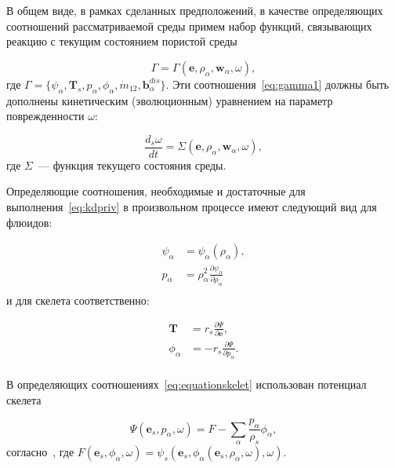 В общем виде, в рамках сделанных предположений, в качестве определяющих соотношений рассматриваемой среды примем набор функций, связывающих реакцию  с текущим состоянием пористой среды

\begin{equation}
  \label{eq:gamma1}
  \Gamma = \Gamma(\textbf{e}, \rho_{\alpha}, \textbf{w}_{\alpha}, \omega),
\end{equation}
где $\Gamma =  \{ \psi_{\alpha}, \textbf{T}_s, p_{\alpha}, \phi_{\alpha}, \dot{m}_{12}, \textbf{b}^{dis}_{\alpha} \}$. Эти соотношения~\eqref{eq:gamma1} должны быть дополнены кинетическим (эволюционным) уравнением на параметр поврежденности $\omega$:

\begin{equation}
  \label{eq:omega1}
  \frac{d_s \omega}{dt} = \Sigma (\textbf{e}, \rho_{\alpha}, \textbf{w}_{\alpha}, \omega),
\end{equation}
где $\Sigma$~--- функция текущего состояния среды.

Определяющие соотношения, необходимые и достаточные для выполнения~\eqref{eq:kdpriv} в произвольном процессе имеют следующий вид для флюидов:

\begin{equation}
  \label{eq:equationfluid}
        \begin{aligned}
                \psi_{\alpha} &= \psi_{\alpha} (\rho_{\alpha}), \\
                p_{\alpha} &= \rho_{\alpha}^2 \frac{\partial \psi_{\alpha}}{\partial \rho_{\alpha}} \\
        \end{aligned}
\end{equation}
и для скелета соответственно:

\begin{equation}
  \label{eq:equationskelet}
        \begin{aligned}
                {\textbf{T}} &= r_s \frac{\partial \Psi}{\partial \textbf{e}}, \\
                \phi_{\alpha} &= -r_s \frac{\partial \Psi}{\partial p_{\alpha}}. \\
        \end{aligned}
\end{equation}

В определяющих соотношениях~\eqref{eq:equationskelet} использован потенциал скелета

$$
\Psi (\textbf{e}_s, p_{\alpha}, \omega ) = F - \sum_{\alpha}{\frac{p_{\alpha}}{\rho_s} \phi_{\alpha}}, 
$$
согласно~\autocite{kondaurov2007}, где $F(\textbf{e}_s, \phi_{\alpha}, \omega) = \psi_s (\textbf{e}_s, \phi_{\alpha}(\textbf{e}_s, \rho_{\alpha}, \omega), \omega)$.


